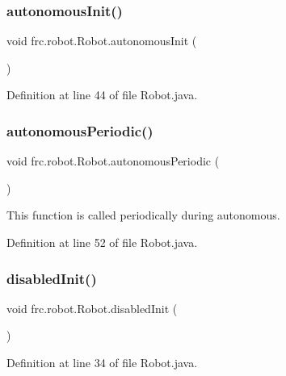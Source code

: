 \subsubsection{\texorpdfstring{autonomous\+Init()}{autonomousInit()}}
{\footnotesize\ttfamily void frc.\+robot.\+Robot.\+autonomous\+Init (\begin{DoxyParamCaption}{ }\end{DoxyParamCaption})}



Definition at line 44 of file Robot.\+java.

\mbox{\label{classfrc_1_1robot_1_1_robot_a7dcfe7d0d65d1051eb095b8eb1aebd72}} 
\subsubsection{\texorpdfstring{autonomous\+Periodic()}{autonomousPeriodic()}}
{\footnotesize\ttfamily void frc.\+robot.\+Robot.\+autonomous\+Periodic (\begin{DoxyParamCaption}{ }\end{DoxyParamCaption})}



This function is called periodically during autonomous. 



Definition at line 52 of file Robot.\+java.

\mbox{\label{classfrc_1_1robot_1_1_robot_ac19810fbf26efd4cd47cbd7568b4ad2a}} 
\subsubsection{\texorpdfstring{disabled\+Init()}{disabledInit()}}
{\footnotesize\ttfamily void frc.\+robot.\+Robot.\+disabled\+Init (\begin{DoxyParamCaption}{ }\end{DoxyParamCaption})}



Definition at line 34 of file Robot.\+java.

